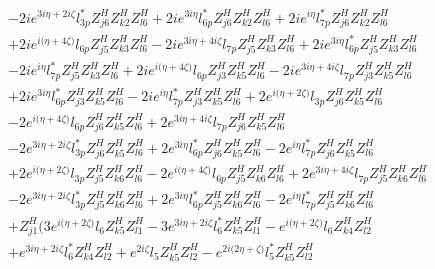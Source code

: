 \begin{align}
 &-2 i e^{3 i \eta +2 i \zeta } l_{3p}^* Z_{{j 6}}^{H} Z_{{k 2}}^{H} Z_{{l 6}}^{H} +2 i e^{3 i \eta } l_{6p}^* Z_{{j 6}}^{H} Z_{{k 2}}^{H} Z_{{l 6}}^{H} +2 i e^{i \eta } l_{7p}^* Z_{{j 6}}^{H} Z_{{k 2}}^{H} Z_{{l 6}}^{H} \nonumber \\ 
 &+2 i e^{i \Big(\eta +4 \zeta \Big)} l_{6p} Z_{{j 5}}^{H} Z_{{k 3}}^{H} Z_{{l 6}}^{H} -2 i e^{3 i \eta +4 i \zeta } l_{7p} Z_{{j 5}}^{H} Z_{{k 3}}^{H} Z_{{l 6}}^{H} +2 i e^{3 i \eta } l_{6p}^* Z_{{j 5}}^{H} Z_{{k 3}}^{H} Z_{{l 6}}^{H} \nonumber \\ 
 &-2 i e^{i \eta } l_{7p}^* Z_{{j 5}}^{H} Z_{{k 3}}^{H} Z_{{l 6}}^{H} +2 i e^{i \Big(\eta +4 \zeta \Big)} l_{6p} Z_{{j 3}}^{H} Z_{{k 5}}^{H} Z_{{l 6}}^{H} -2 i e^{3 i \eta +4 i \zeta } l_{7p} Z_{{j 3}}^{H} Z_{{k 5}}^{H} Z_{{l 6}}^{H} \nonumber \\ 
 &+2 i e^{3 i \eta } l_{6p}^* Z_{{j 3}}^{H} Z_{{k 5}}^{H} Z_{{l 6}}^{H} -2 i e^{i \eta } l_{7p}^* Z_{{j 3}}^{H} Z_{{k 5}}^{H} Z_{{l 6}}^{H} +2 e^{i \Big(\eta +2 \zeta \Big)} l_{3p} Z_{{j 6}}^{H} Z_{{k 5}}^{H} Z_{{l 6}}^{H} \nonumber \\ 
 &-2 e^{i \Big(\eta +4 \zeta \Big)} l_{6p} Z_{{j 6}}^{H} Z_{{k 5}}^{H} Z_{{l 6}}^{H} +2 e^{3 i \eta +4 i \zeta } l_{7p} Z_{{j 6}}^{H} Z_{{k 5}}^{H} Z_{{l 6}}^{H} \nonumber \\ 
 &-2 e^{3 i \eta +2 i \zeta } l_{3p}^* Z_{{j 6}}^{H} Z_{{k 5}}^{H} Z_{{l 6}}^{H} +2 e^{3 i \eta } l_{6p}^* Z_{{j 6}}^{H} Z_{{k 5}}^{H} Z_{{l 6}}^{H} -2 e^{i \eta } l_{7p}^* Z_{{j 6}}^{H} Z_{{k 5}}^{H} Z_{{l 6}}^{H} \nonumber \\ 
 &+2 e^{i \Big(\eta +2 \zeta \Big)} l_{3p} Z_{{j 5}}^{H} Z_{{k 6}}^{H} Z_{{l 6}}^{H} -2 e^{i \Big(\eta +4 \zeta \Big)} l_{6p} Z_{{j 5}}^{H} Z_{{k 6}}^{H} Z_{{l 6}}^{H} +2 e^{3 i \eta +4 i \zeta } l_{7p} Z_{{j 5}}^{H} Z_{{k 6}}^{H} Z_{{l 6}}^{H} \nonumber \\ 
 &-2 e^{3 i \eta +2 i \zeta } l_{3p}^* Z_{{j 5}}^{H} Z_{{k 6}}^{H} Z_{{l 6}}^{H} +2 e^{3 i \eta } l_{6p}^* Z_{{j 5}}^{H} Z_{{k 6}}^{H} Z_{{l 6}}^{H} -2 e^{i \eta } l_{7p}^* Z_{{j 5}}^{H} Z_{{k 6}}^{H} Z_{{l 6}}^{H} \nonumber \\ 
 &+Z_{{j 1}}^{H} \Big(3 e^{i \Big(\eta +2 \zeta \Big)} l_6 Z_{{k 5}}^{H} Z_{{l 1}}^{H} -3 e^{3 i \eta +2 i \zeta } l_6^* Z_{{k 5}}^{H} Z_{{l 1}}^{H} - e^{i \Big(\eta +2 \zeta \Big)} l_6 Z_{{k 4}}^{H} Z_{{l 2}}^{H} \nonumber \\ 
 &+e^{3 i \eta +2 i \zeta } l_6^* Z_{{k 4}}^{H} Z_{{l 2}}^{H} +e^{2 i \zeta } l_5 Z_{{k 5}}^{H} Z_{{l 2}}^{H} - e^{2 i \Big(2 \eta +\zeta \Big)} l_5^* Z_{{k 5}}^{H} Z_{{l 2}}^{H} \nonumber \\ 

\end{align}
